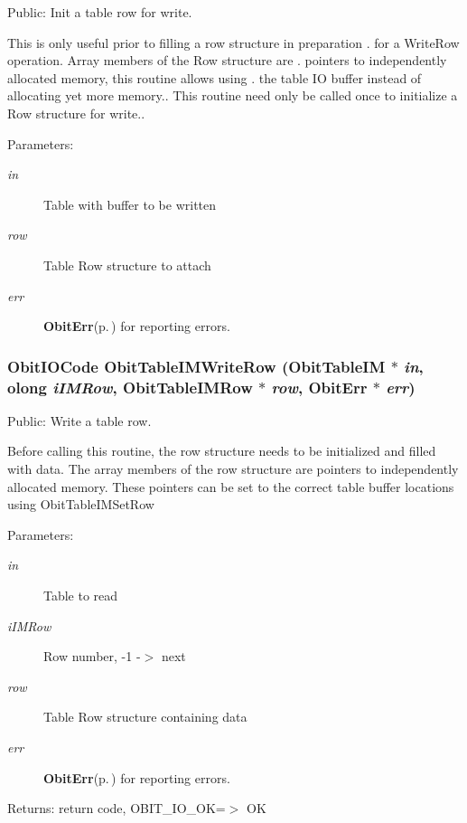 Public: Init a table row for write. 

This is only useful prior to filling a row structure in preparation . for a Write\-Row operation. Array members of the Row structure are . pointers to independently allocated memory, this routine allows using . the table IO buffer instead of allocating yet more memory.. This routine need only be called once to initialize a Row structure for write.. \begin{Desc}
\item[Parameters:]
\begin{description}
\item[{\em in}]Table with buffer to be written \item[{\em row}]Table Row structure to attach \item[{\em err}]{\bf Obit\-Err}{\rm (p.\,\pageref{structObitErr})} for reporting errors. \end{description}
\end{Desc}
\subsubsection{\setlength{\rightskip}{0pt plus 5cm}Obit\-IOCode Obit\-Table\-IMWrite\-Row ({\bf Obit\-Table\-IM} $\ast$ {\em in}, {\bf olong} {\em i\-IMRow}, {\bf Obit\-Table\-IMRow} $\ast$ {\em row}, {\bf Obit\-Err} $\ast$ {\em err})}\label{ObitTableIM_8h_a20}


Public: Write a table row. 

Before calling this routine, the row structure needs to be initialized and filled with data. The array members of the row structure are pointers to independently allocated memory. These pointers can be set to the correct table buffer locations using Obit\-Table\-IMSet\-Row \begin{Desc}
\item[Parameters:]
\begin{description}
\item[{\em in}]Table to read \item[{\em i\-IMRow}]Row number, -1 -$>$ next \item[{\em row}]Table Row structure containing data \item[{\em err}]{\bf Obit\-Err}{\rm (p.\,\pageref{structObitErr})} for reporting errors. \end{description}
\end{Desc}
\begin{Desc}
\item[Returns:]return code, OBIT\_\-IO\_\-OK=$>$ OK \end{Desc}
